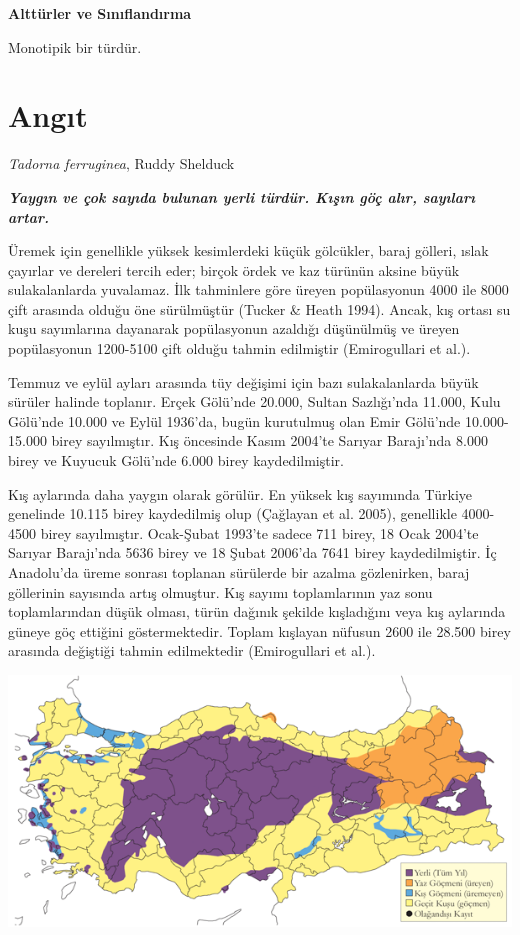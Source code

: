 \documentclass[
  letterpaper,
  DIV=11,
  numbers=noendperiod]{scrreprt}
\begin{document}
\textbf{Alttürler ve Sınıflandırma}

Monotipik bir türdür.

\section{Angıt}\label{angux131t}

\emph{Tadorna ferruginea}, Ruddy Shelduck

\textbf{\emph{Yaygın ve çok sayıda bulunan yerli türdür. Kışın göç alır,
sayıları artar.}}

Üremek için genellikle yüksek kesimlerdeki küçük gölcükler, baraj
gölleri, ıslak çayırlar ve dereleri tercih eder; birçok ördek ve kaz
türünün aksine büyük sulakalanlarda yuvalamaz. İlk tahminlere göre
üreyen popülasyonun 4000 ile 8000 çift arasında olduğu öne sürülmüştür
(Tucker \& Heath 1994). Ancak, kış ortası su kuşu sayımlarına dayanarak
popülasyonun azaldığı düşünülmüş ve üreyen popülasyonun 1200-5100 çift
olduğu tahmin edilmiştir (Emirogullari et al.).

Temmuz ve eylül ayları arasında tüy değişimi için bazı sulakalanlarda
büyük sürüler halinde toplanır. Erçek Gölü'nde 20.000, Sultan
Sazlığı'nda 11.000, Kulu Gölü'nde 10.000 ve Eylül 1936'da, bugün
kurutulmuş olan Emir Gölü'nde 10.000-15.000 birey sayılmıştır. Kış
öncesinde Kasım 2004'te Sarıyar Barajı'nda 8.000 birey ve Kuyucuk
Gölü'nde 6.000 birey kaydedilmiştir.

Kış aylarında daha yaygın olarak görülür. En yüksek kış sayımında
Türkiye genelinde 10.115 birey kaydedilmiş olup (Çağlayan et al. 2005),
genellikle 4000-4500 birey sayılmıştır. Ocak-Şubat 1993'te sadece 711
birey, 18 Ocak 2004'te Sarıyar Barajı'nda 5636 birey ve 18 Şubat 2006'da
7641 birey kaydedilmiştir. İç Anadolu'da üreme sonrası toplanan
sürülerde bir azalma gözlenirken, baraj göllerinin sayısında artış
olmuştur. Kış sayımı toplamlarının yaz sonu toplamlarından düşük olması,
türün dağınık şekilde kışladığını veya kış aylarında güneye göç ettiğini
göstermektedir. Toplam kışlayan nüfusun 2600 ile 28.500 birey arasında
değiştiği tahmin edilmektedir (Emirogullari et al.).

\includegraphics{images/harita_Page_013.png}
\end{document}
